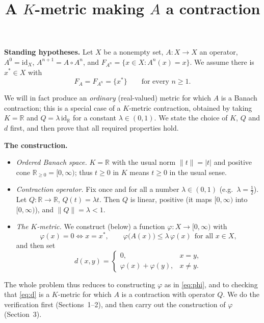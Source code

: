 \documentclass{amsart}
\theoremstyle{definition}
\begin{document}
\title{A $K$-metric making $A$ a contraction}
\maketitle

\noindent\textbf{Standing hypotheses.} Let $X$ be a nonempty set, $A:X\to X$ an
operator, $A^0=\mathrm{id}_X$, $A^{n+1}=A\circ A^n$, and
$F_{A^n}=\{x\in X: A^n(x)=x\}$. We assume there is $x^*\in X$ with
\begin{equation}\label{eq:hyp}
  F_A=F_{A^n}=\{x^*\}\qquad\text{for every }n\ge 1 .
\end{equation}

We will in fact produce an \emph{ordinary} (real-valued) metric for which $A$ is a
Banach contraction; this is a special case of a $K$-metric contraction, obtained
by taking $K=\mathbb{R}$ and $Q=\lambda\,\mathrm{id}_{\mathbb{R}}$ for a constant
$\lambda\in(0,1)$. We state the choice of $K$, $Q$ and $d$ first, and then prove
that all required properties hold.

\bigskip
\noindent\textbf{The construction.}
\begin{itemize}
\item \emph{Ordered Banach space.} $K=\mathbb{R}$ with the usual norm $\lVert
t\rVert=|t|$ and positive cone $\mathbb{R}_{\ge 0}=[0,\infty)$; thus $t\ge 0$ in
$K$ means $t\ge 0$ in the usual sense.
\item \emph{Contraction operator.} Fix once and for all a number
$\lambda\in(0,1)$ (e.g.\ $\lambda=\tfrac12$). Let $Q:\mathbb{R}\to\mathbb{R}$,
$Q(t)=\lambda t$. Then $Q$ is linear, positive (it maps $[0,\infty)$ into
$[0,\infty)$), and $\lVert Q\rVert=\lambda<1$.
\item \emph{The $K$-metric.} We construct (below) a function
$\varphi:X\to[0,\infty)$ with
\begin{equation}\label{eq:phi}
\varphi(x)=0\iff x=x^*,\qquad
\varphi\bigl(A(x)\bigr)\le\lambda\,\varphi(x)\ \ \text{for all }x\in X,
\end{equation}
and then set
\begin{equation}\label{eq:d}
  d(x,y)=
  \begin{cases}
    0, & x=y,\\
    \varphi(x)+\varphi(y), & x\ne y.
  \end{cases}
\end{equation}
\end{itemize}

The whole problem thus reduces to constructing $\varphi$ as in \eqref{eq:phi}, and
to checking that \eqref{eq:d} is a $K$-metric for which $A$ is a contraction with
operator $Q$. We do the verification first (Sections~1--2), and then carry out the
construction of $\varphi$ (Section~3).
\end{document}
